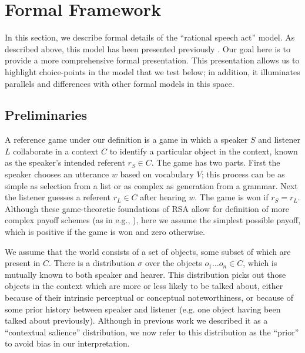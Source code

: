 \documentclass[man,noapacite]{apa2}
\begin{document}
\section{Formal Framework}
\label{sec:models}

In this section, we describe formal details of the ``rational speech act'' model. As described above, this model has been presented previously \cite{frank2012,goodman2013}. Our goal here is to provide a more comprehensive formal presentation. This presentation allows us to highlight choice-points in the model that we test below; in addition, it illuminates parallels and differences with other formal models in this space.



\subsection{Preliminaries}

A reference game under our definition is a game in which a speaker $S$ and listener $L$ collaborate in a context $C$ to identify a particular object in the context, known as the speaker's intended referent $r_S \in C$. The game has two parts. First the speaker chooses an utterance $w$ based on vocabulary $V$; this process can be as simple as selection from a list or as complex as generation from a grammar. Next the listener guesses a referent $r_L \in C$ after hearing $w$. The game is won if $r_S=r_L$. Although these game-theoretic foundations of RSA allow for definition of more complex payoff schemes (as in e.g., ), here we assume the simplest possible payoff, which is positive if the game is won and zero otherwise.

We assume that the world consists of a set of objects, some subset of which are present in $C$. There is a distribution $\sigma$ over the objects ${o_1 ... o_n} \in C$, which is mutually known to both speaker and hearer. This distribution picks out those objects in the context which are more or less likely to be talked about, either because of their intrinsic perceptual or conceptual noteworthiness, or because of some prior history between speaker and listener (e.g. one object having been talked about previously). Although in previous work we described it as a ``contextual salience'' distribution, we now refer to this distribution as the ``prior'' to avoid bias in our interpretation.
\end{document}
